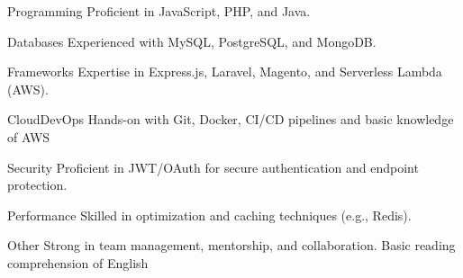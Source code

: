 

\begin{cvskills}

  \cvskill
    {Programming} %
    {Proficient in JavaScript, PHP, and Java.} %

  \cvskill
    {Databases} %
    {Experienced with MySQL, PostgreSQL, and MongoDB.} %

  \cvskill
    {Frameworks} %
    {Expertise in Express.js, Laravel, Magento, and Serverless Lambda (AWS).} %

  \cvskill
    {CloudDevOps} %
    {Hands-on with Git, Docker, CI/CD pipelines and basic knowledge of AWS} %

  \cvskill
    {Security} %
    {Proficient in JWT/OAuth for secure authentication and endpoint protection.} %

  \cvskill
    {Performance} %
    { Skilled in optimization and caching techniques (e.g., Redis).} %

  \cvskill
    {Other} %
    {Strong in team management, mentorship, and collaboration. Basic reading comprehension of English} %

\end{cvskills}
